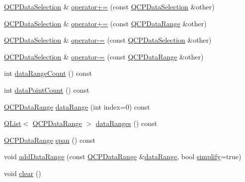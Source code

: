\begin{DoxyCompactItemize}
\item 
\hyperlink{class_q_c_p_data_selection}{Q\+C\+P\+Data\+Selection} \& \hyperlink{class_q_c_p_data_selection_a4584d4b0ea5c4f095bd7b70f88eb5d9d}{operator+=} (const \hyperlink{class_q_c_p_data_selection}{Q\+C\+P\+Data\+Selection} \&other)
\item 
\hyperlink{class_q_c_p_data_selection}{Q\+C\+P\+Data\+Selection} \& \hyperlink{class_q_c_p_data_selection_a17058640d4e6f49984a0e7e42043df1b}{operator+=} (const \hyperlink{class_q_c_p_data_range}{Q\+C\+P\+Data\+Range} \&other)
\item 
\hyperlink{class_q_c_p_data_selection}{Q\+C\+P\+Data\+Selection} \& \hyperlink{class_q_c_p_data_selection_a66f9fab70b026baa64bf8e52fe5de07e}{operator-\/=} (const \hyperlink{class_q_c_p_data_selection}{Q\+C\+P\+Data\+Selection} \&other)
\item 
\hyperlink{class_q_c_p_data_selection}{Q\+C\+P\+Data\+Selection} \& \hyperlink{class_q_c_p_data_selection_a8d18b20d20dde737eefc10967e31cf73}{operator-\/=} (const \hyperlink{class_q_c_p_data_range}{Q\+C\+P\+Data\+Range} \&other)
\item 
int \hyperlink{class_q_c_p_data_selection_a7edbfbaf77e22f70216749e73818e247}{data\+Range\+Count} () const 
\item 
int \hyperlink{class_q_c_p_data_selection_a492de1528df9cc6a73fd2883fe5b47b9}{data\+Point\+Count} () const 
\item 
\hyperlink{class_q_c_p_data_range}{Q\+C\+P\+Data\+Range} \hyperlink{class_q_c_p_data_selection_a6a9c39a2019cd6d2fdd329f415262b34}{data\+Range} (int index=0) const 
\item 
\hyperlink{class_q_list}{Q\+List}$<$ \hyperlink{class_q_c_p_data_range}{Q\+C\+P\+Data\+Range} $>$ \hyperlink{class_q_c_p_data_selection_a74b63e4a98eb5eba0f6d77d2d4161a9a}{data\+Ranges} () const 
\item 
\hyperlink{class_q_c_p_data_range}{Q\+C\+P\+Data\+Range} \hyperlink{class_q_c_p_data_selection_a28057205d0b066f96b26bed79184b32b}{span} () const 
\item 
void \hyperlink{class_q_c_p_data_selection_a46740c5aa7b80ae9b2abf6985d61b74f}{add\+Data\+Range} (const \hyperlink{class_q_c_p_data_range}{Q\+C\+P\+Data\+Range} \&\hyperlink{class_q_c_p_data_selection_a6a9c39a2019cd6d2fdd329f415262b34}{data\+Range}, bool \hyperlink{class_q_c_p_data_selection_a4a2fbad1a6e4d1dd26fdfdf88956f2a4}{simplify}=true)
\item 
void \hyperlink{class_q_c_p_data_selection_a385dd665e6690d39afb8bbd727b1e00b}{clear} ()
\item 

\end{DoxyCompactItemize}
